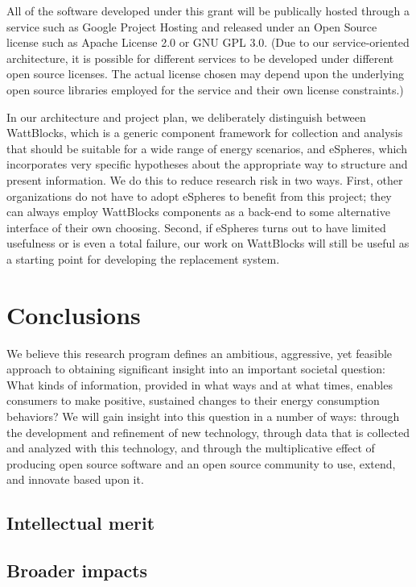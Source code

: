 All of the software developed under this grant will be publically hosted
through a service such as Google Project Hosting and released under an Open
Source license such as Apache License 2.0 or GNU GPL 3.0.  (Due to our
service-oriented architecture, it is possible for different services to be
developed under different open source licenses.  The actual license chosen
may depend upon the underlying open source libraries employed for the
service and their own license constraints.)

In our architecture and project plan, we deliberately distinguish between
WattBlocks, which is a generic component framework for collection and
analysis that should be suitable for a wide range of energy scenarios, and
eSpheres, which incorporates very specific hypotheses about the appropriate
way to structure and present information.  We do this to reduce research
risk in two ways. First, other organizations do not have to adopt eSpheres
to benefit from this project; they can always employ WattBlocks components
as a back-end to some alternative interface of their own choosing.  Second,
if eSpheres turns out to have limited usefulness or is even a total
failure, our work on WattBlocks will still be useful as a starting point
for developing the replacement system.

\section{Conclusions}
\label{sec:merit}

We believe this research program defines an ambitious, aggressive, yet
feasible approach to obtaining significant insight into an important
societal question: What kinds of information, provided in what ways and at
what times, enables consumers to make positive, sustained changes to their
energy consumption behaviors?  We will gain insight into this question in a
number of ways: through the development and refinement of new technology,
through data that is collected and analyzed with this technology, and
through the multiplicative effect of producing open source software and an
open source community to use, extend, and innovate based upon it.


\subsection{Intellectual merit}

\subsection{Broader impacts}





